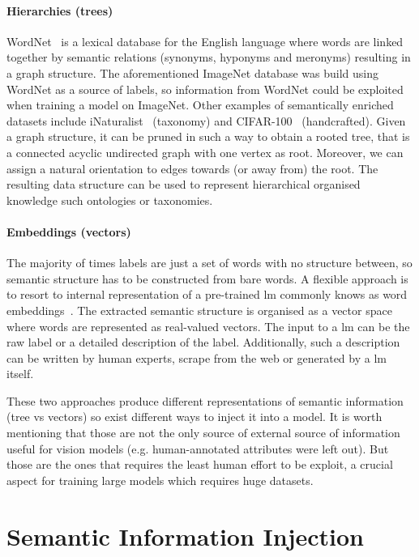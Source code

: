 \paragraph{Hierarchies (trees)}
\label{par:hierarchies-tree}
WordNet~\cite{WordnetMi1995} is a lexical database for the English language
where words are linked together by semantic relations (synonyms, hyponyms and
meronyms) resulting in a graph structure. The aforementioned ImageNet database
was build using WordNet as a source of labels, so information from WordNet could
be exploited when training a model on ImageNet. Other examples of semantically
enriched datasets include iNaturalist~\cite{TheInaturalistHorn2017} (taxonomy)
and CIFAR-100~\cite{LearningMultipKrizhe2009} (handcrafted). Given a graph
structure, it can be pruned in such a way to obtain a rooted tree, that is a
connected acyclic undirected graph with one vertex as root. Moreover, we can
assign a natural orientation to edges towards (or away from) the root. The
resulting data structure can be used to represent hierarchical organised
knowledge such ontologies or taxonomies.

\paragraph{Embeddings (vectors)}
\label{par:embeddings-vectors}
The majority of times labels are just a set of words with no structure between,
so semantic structure has to be constructed from bare words. A flexible
approach is to resort to internal representation of a pre-trained \acrfull{lm}
commonly knows as word embeddings~\cite{BeyondWordEmbIncitt2023}.
The extracted semantic structure is organised as a vector space where words are
represented as real-valued vectors. The input to a \acrshort{lm} can be the raw label or a
detailed description of the label. Additionally, such a description can be written
by human experts, scrape from the web or generated by a \acrshort{lm} itself.\medskip

These two approaches produce different representations of semantic information
(tree vs vectors) so exist different ways to inject it into a model. It is
worth mentioning that those are not the only source of external source of
information useful for vision models (e.g. human-annotated attributes were left
out). But those are the ones that requires the least human effort to be
exploit, a crucial aspect for training large models which requires huge
datasets.

\section{Semantic Information Injection}
\label{sec:semantic-information-injection}

